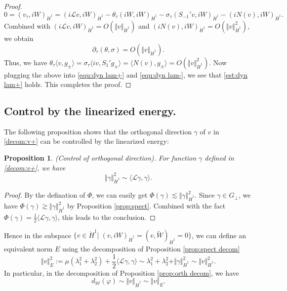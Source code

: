 \documentclass[reqno, 11pt]{amsart}
\numberwithin{equation}{section}
\theoremstyle{plain}
\newtheorem{proposition}[theorem]{Proposition}
\theoremstyle{definition}
\numberwithin{equation}{section}
\numberwithin{theorem}{section}
\numberwithin{equation}{section}
\numberwithin{equation}{section}
\numberwithin{theorem}{section}
\begin{document}
\begin{proof}
\begin{equation*}
		0=(v_{\tau},iW)_{\dot H^1}=(i\mathcal{L}v,iW)_{\dot H^1}-\theta_{\tau}(iW,iW)_{\dot H^1}-\sigma_{\tau}(S_{-1}'v,iW)_{\dot H^1} -(iN(v),iW)_{\dot H^1}.
		\end{equation*}
		Combined with $(i\mathcal{L}v,iW)_{\dot H^1}=O(\Vert v\Vert_{\dot H^1})$ and $(iN(v),iW)_{\dot H^1}=O(\Vert v\Vert_{\dot H^1}^2)$, we obtain
		\begin{equation}\label{est:para}
		\partial_{\tau}(\theta,\sigma)=O \left(\Vert v\Vert_{\dot H^1}\right).
		\end{equation}	
		Thus, we have $\theta_{\tau}\langle v,g_\pm\rangle=\sigma_{\tau}\langle iv,S_{1}'g_\pm\rangle=\langle N(v),g_\pm\rangle=O(\Vert v\Vert_{\dot H^1}^2)$. Now plugging the above into \eqref{equ:dyn lam+} and \eqref{equ:dyn lam-}, we see that \eqref{est:dyn lam+} holds. This completes the proof.
	\end{proof}
	
	
	
	\subsection{Control by the linearized energy.} The following proposition shows that the orthogonal direction $\gamma$ of $v$ in \eqref{decom:v+} can be controlled by the linearized energy:
	\begin{proposition}(Control of orthogonal direction)\label{prop:orth cntl}. For function $\gamma$ defined in \eqref{decom:v+}, we have
		\begin{equation*}
		\Vert \gamma \Vert_{\dot H^1}^2 \sim \langle \mathcal{L}\gamma,\gamma \rangle.
		\end{equation*}
	\end{proposition}
	
	\begin{proof}
		By the defination of $\Phi$, we can easily get $\Phi(\gamma)\lesssim \Vert \gamma \Vert_{\dot H^1}^2$. Since $\gamma\in G_{\bot}$, we have $\Phi(\gamma)\gtrsim \Vert \gamma \Vert_{\dot H^1}^2$ by Proposition \ref{prop:spect}. Combined with the fact $\Phi(\gamma)=\frac12\langle \mathcal{L}\gamma,\gamma \rangle$, this leads to the conclusion.
	\end{proof}
	Hence in the subspace $\{ v\in\dot H^1|\; (v,iW)_{\dot H^1}=(v,\widetilde{W})_{\dot H^1}=0 \}$, we can define an equivalent norm $E$ using the decomposition of Proposition \ref{prop:spect decom}
	\begin{equation}\label{quan:equi nor}
	\Vert v \Vert_{E}^2:=\mu (\lambda_{1}^{2}+\lambda_{2}^{2})+\frac{1}{2}\langle \mathcal{L}\gamma,\gamma \rangle \sim \lambda_{1}^{2}+\lambda_{2}^{2}+\Vert \gamma \Vert_{\dot H^1}^2 \sim \Vert v \Vert_{\dot H^1}^2.
	\end{equation}
	In particular, in the decomposition of Proposition \ref{prop:orth decom}, we have
	\begin{equation*}
	d_{\mathcal{W}}(\varphi) \sim \Vert v \Vert_{\dot H^1} \sim \Vert v \Vert_{E}.
	\end{equation*}
	
\end{document}
